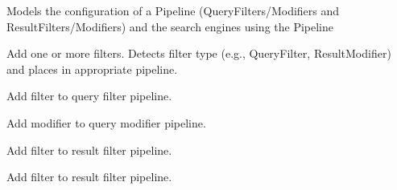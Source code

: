 \documentclass[letterpaper,10pt,english]{sphinxmanual}
\begin{document}
\begin{fulllineitems}
\label{api2.0:puppy.pipeline.PipelineService}
Models the configuration of a Pipeline (QueryFilters/Modifiers and ResultFilters/Modifiers) and the search engines using the Pipeline

\begin{fulllineitems}
\label{api2.0:puppy.pipeline.PipelineService.add_filters}
Add one or more filters. Detects filter type (e.g., QueryFilter, ResultModifier) and places in appropriate pipeline.

\end{fulllineitems}


\begin{fulllineitems}
\label{api2.0:puppy.pipeline.PipelineService.add_query_filter}
Add filter to query filter pipeline.

\end{fulllineitems}


\begin{fulllineitems}
\label{api2.0:puppy.pipeline.PipelineService.add_query_modifier}
Add modifier to query modifier pipeline.

\end{fulllineitems}


\begin{fulllineitems}
\label{api2.0:puppy.pipeline.PipelineService.add_result_filter}
Add filter to result filter pipeline.

\end{fulllineitems}


\begin{fulllineitems}
\label{api2.0:puppy.pipeline.PipelineService.add_result_modifier}
Add filter to result filter pipeline.


\end{fulllineitems}
\end{fulllineitems}
\end{document}
